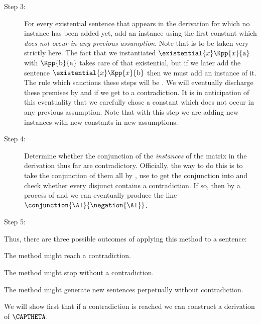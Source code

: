 \begin{description}
\item[Step 3:] For every existential sentence that appears in the derivation for which no instance has been added yet, add an instance using the first constant which \emph{does not occur in any previous assumption}. 
Note that  is to be taken very strictly here. 
The fact that we instantiated $\existential{\variable{x}}\Kpp{\variable{x}}{\constant{a}}$ with $\Kpp{\constant{b}}{\constant{a}}$ takes care of that existential, but if we later add the sentence $\existential{\variable{x}}\Kpp{\variable{x}}{\constant{b}}$ then we must add an instance of it. 
The rule which sanctions these steps will be . 
We will eventually discharge these premises by  and  if we get to a contradiction.
It is in anticipation of this eventuality that we carefully chose a constant which does not occur in any previous assumption.
Note that with this step we are adding new instances with new constants in new assumptions. 

\item[Step 4:] Determine whether the conjunction of the \emph{instances} of the matrix in the derivation thus far are contradictory. 
Officially, the way to do this is to take the conjunction of them all by , use  to get the conjunction into  and check whether every disjunct contains a contradiction. 
If so, then by a process of  and  we can eventually produce the line $\conjunction{\Al}{\negation{\Al}}$. 

\item[Step 5:] \hfill
{}
\end{description}
Thus, there are three possible outcomes of applying this method to a sentence:
\begin{cenumerate}
\item The method might reach a contradiction.
\item The method might stop without a contradiction.
\item The method might generate new sentences perpetually without contradiction.
\end{cenumerate}
We will show first that if a contradiction is reached we can construct a derivation of $\CAPTHETA$. 

